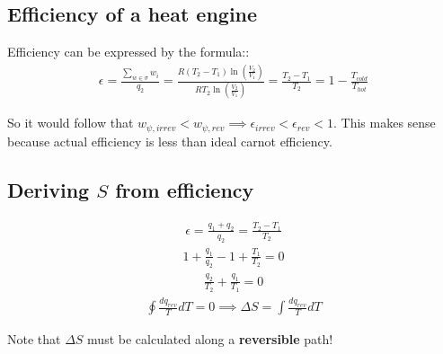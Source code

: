 \documentclass[12pt]{book}
\begin{document}
\subsection*{Efficiency of a heat engine}
Efficiency can be expressed by the formula::
\begin{align*}
    \epsilon=\frac{\sum_{w\in \sigma}w_i}{q_2}=\frac{R(T_2-T_1)\ln\left(\frac{V_2}{V_1}\right)}{RT_2\ln\left(\frac{V_2}{V_1}\right)}=\frac{T_2-T_1}{T_2}=1-\frac{T_{cold}}{T_{hot}}
\end{align*}

So it would follow that $w_{\psi,irrev}<w_{\psi,rev}\implies \epsilon_{irrev}<\epsilon_{rev}<1$. This makes sense because actual efficiency is less than ideal carnot efficiency.

\subsection*{Deriving $S$ from efficiency}

\begin{align*}
    \epsilon=\frac{q_1+q_2}{q_2}=\frac{T_2-T_1}{T_2}
\end{align*}
\begin{align*}
    1+\frac{q_1}{q_2}-1+\frac{T_1}{T_2}=0
\end{align*}
\begin{align*}
    \frac{q_2}{T_2}+\frac{q_1}{T_1}=0
\end{align*}
\begin{align*}
    \oint \frac{dq_{rev}}{T}dT=0\implies \Delta S=\int \frac{dq_{rev}}{T}dT
\end{align*}

Note that $\Delta S$ must be calculated along a \textbf{reversible} path!
\end{document}
